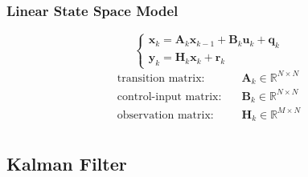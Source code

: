 \documentclass[14pt,hyperref={CJKbookmarks=true}]{beamer}
\theoremstyle{plain}
\theoremstyle{definition}
\theoremstyle{remark}
\begin{document}
\begin{frame}
\frametitle{Linear State Space Model}
\small
\begin{equation*}
\begin{cases}
\mathbf{x}_k=\mathbf{A}_{k}\mathbf{x}_{k-1}+\mathbf{B}_{k}\mathbf{u}_{k}+\mathbf{q}_{k}\\
\mathbf{y}_k=\mathbf{H}_k\mathbf{x}_k+\mathbf{r}_k
\end{cases}
\end{equation*}
\pause
\begin{equation*}
\begin{split}
\text{transition matrix:}\quad& \mathbf{A}_k\in\mathbb{R}^{N\times N}\\
\text{control-input matrix:}\quad& \mathbf{B}_k\in\mathbb{R}^{N\times N}\\
\text{observation matrix:}\quad& \mathbf{H}_k\in\mathbb{R}^{M\times N}\\
\end{split}
\end{equation*}
\end{frame}



\subsection{Kalman Filter}


\end{document}
